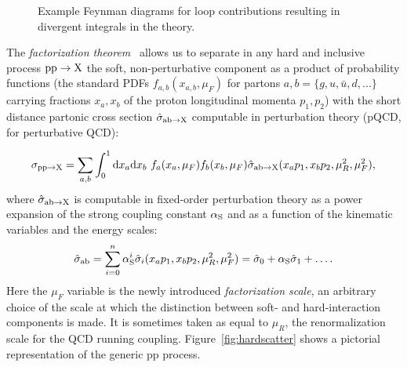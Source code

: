 \begin{figure}[hbt]
\begin{center}
        \myskip
\resizebox{1.\textwidth}{!}{}
        \myskip
	\caption{Example Feynman diagrams for loop contributions
        resulting in divergent integrals in the theory. \label{fig:feyndLOOP}}
\end{center}
\end{figure}

The {\it factorization theorem}~\cite{Campbell:2006wx} 
allows us to separate 
in any hard and inclusive process ${\rm pp}\to{\rm X}$
the soft, non-perturbative component 
as a product of probability functions 
(the standard PDFs $f_{a,b}(x_{a,b},\mu_{F})$ 
for partons $a,b = \{g,u,\bar{u},d,...\}$ 
 carrying fractions $x_a,x_b$ of the proton longitudinal momenta
$p_1, p_2$) with
the short distance partonic cross section $\hat{\sigma}_{{\rm ab}\to{\rm X}}$
computable in perturbation theory (pQCD, for perturbative QCD):

\begin{equation}
  \sigma_{{\rm pp}\to{\rm X}}
  = \sum_{a,b}%
  \int_{0}^{1}{\rm d}x_a{\rm d}x_b
  ~ f_a(x_a,\mu_{F}) f_b(x_b,\mu_{F})
  \hat{\sigma}_{{\rm ab}\to{\rm X}}(x_ap_1, x_bp_2,\mu_R^2,\mu_{F}^2),
\label{eq:QCDCrossSection}
\end{equation}
where $\hat{\sigma}_{{\rm ab}\to{\rm X}}$ is computable 
in fixed-order perturbation theory 
as a power expansion of the strong coupling 
constant $\alphas$ and as a function of 
the kinematic variables and the energy scales:
\begin{equation}
\label{eq:QCDPartonicCrossSection}
\hat{\sigma}_{{\rm ab}}=\sum_{i=0}^{n} \alphas^i \hat{\sigma}_i(x_ap_1, x_bp_2,\mu_R^2,\mu_{F}^2)=\hat{\sigma}_0+\alphas \hat{\sigma}_1+\dots.
\end{equation}
Here the $\mu_{F}$ variable is the newly introduced {\it factorization scale}, 
an arbitrary choice of the scale at which the distinction between
soft- and hard-interaction components is made. It is sometimes taken as
equal to $\mu_{R}$, the renormalization scale for the QCD running coupling. 
Figure~\ref{fig:hardscatter} shows a pictorial
representation of the generic pp process.

